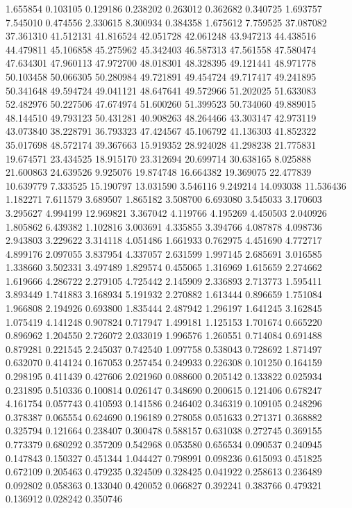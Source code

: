 1.655854
0.103105
0.129186
0.238202
0.263012
0.362682
0.340725
1.693757
7.545010
0.474556
2.330615
8.300934
0.384358
1.675612
7.759525
37.087082
37.361310
41.512131
41.816524
42.051728
42.061248
43.947213
44.438516
44.479811
45.106858
45.275962
45.342403
46.587313
47.561558
47.580474
47.634301
47.960113
47.972700
48.018301
48.328395
49.121441
48.971778
50.103458
50.066305
50.280984
49.721891
49.454724
49.717417
49.241895
50.341648
49.594724
49.041121
48.647641
49.572966
51.202025
51.633083
52.482976
50.227506
47.674974
51.600260
51.399523
50.734060
49.889015
48.144510
49.793123
50.431281
40.908263
48.264466
43.303147
42.973119
43.073840
38.228791
36.793323
47.424567
45.106792
41.136303
41.852322
35.017698
48.572174
39.367663
15.919352
28.924028
41.298238
21.775831
19.674571
23.434525
18.915170
23.312694
20.699714
30.638165
8.025888
21.600863
24.639526
9.925076
19.874748
16.664382
19.369075
22.477839
10.639779
7.333525
15.190797
13.031590
3.546116
9.249214
14.093038
11.536436
1.182271
7.611579
3.689507
1.865182
3.508700
6.693080
3.545033
3.170603
3.295627
4.994199
12.969821
3.367042
4.119766
4.195269
4.450503
2.040926
1.805862
6.439382
1.102816
3.003691
4.335855
3.394766
4.087878
4.098736
2.943803
3.229622
3.314118
4.051486
1.661933
0.762975
4.451690
4.772717
4.899176
2.097055
3.837954
4.337057
2.631599
1.997145
2.685691
3.016585
1.338660
3.502331
3.497489
1.829574
0.455065
1.316969
1.615659
2.274662
1.619666
4.286722
2.279105
4.725442
2.145909
2.336893
2.713773
1.595411
3.893449
1.741883
3.168934
5.191932
2.270882
1.613444
0.896659
1.751084
1.966808
2.194926
0.693800
1.835444
2.487942
1.296197
1.641245
3.162845
1.075419
4.141248
0.907824
0.717947
1.499181
1.125153
1.701674
0.665220
0.896962
1.204550
2.726072
2.033019
1.996576
1.260551
0.714084
0.691488
0.879281
0.221545
2.245037
0.742540
1.097758
0.538043
0.728692
1.871497
0.632070
0.414124
0.167053
0.257454
0.249933
0.226308
0.101250
0.164159
0.298195
0.411439
0.427606
2.021960
0.088600
0.205142
0.133822
0.025934
0.231895
0.510336
0.100814
0.026147
0.348690
0.200615
0.121406
0.678247
4.161754
0.057743
0.410593
0.141586
0.246402
0.346319
0.109105
0.248296
0.378387
0.065554
0.624690
0.196189
0.278058
0.051633
0.271371
0.368882
0.325794
0.121664
0.238407
0.300478
0.588157
0.631038
0.272745
0.369155
0.773379
0.680292
0.357209
0.542968
0.053580
0.656534
0.090537
0.240945
0.147843
0.150327
0.451344
1.044427
0.798991
0.098236
0.615093
0.451825
0.672109
0.205463
0.479235
0.324509
0.328425
0.041922
0.258613
0.236489
0.092802
0.058363
0.133040
0.420052
0.066827
0.392241
0.383766
0.479321
0.136912
0.028242
0.350746
